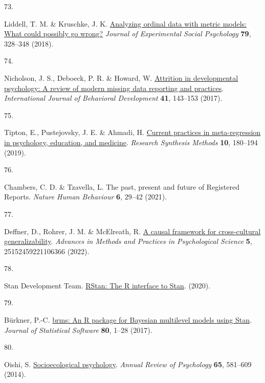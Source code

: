 \documentclass[
  man,floatsintext]{apa6}
\newlength{\cslhangindent}
\newlength{\csllabelwidth}
\newlength{\cslentryspacingunit} %
\newenvironment{CSLReferences}[2] %
 {%
  \setlength{\parindent}{0pt}
  \ifodd #1
  \let\oldpar\par
  \def\par{\hangindent=\cslhangindent\oldpar}
  \fi
  \setlength{\parskip}{#2\cslentryspacingunit}
 }%
 {}
\newcommand{\CSLLeftMargin}[1]{\parbox[t]{\csllabelwidth}{#1}}
\newcommand{\CSLRightInline}[1]{\parbox[t]{\linewidth - \csllabelwidth}{#1}\break}
\begin{document}
\begin{CSLReferences}{0}{0}
\leavevmode{}%
\CSLLeftMargin{73. }%
\CSLRightInline{Liddell, T. M. \& Kruschke, J. K. \href{https://doi.org/10.1016/j.jesp.2018.08.009}{Analyzing ordinal data with metric models: What could possibly go wrong?} \emph{Journal of Experimental Social Psychology} \textbf{79}, 328--348 (2018).}

\leavevmode{}%
\CSLLeftMargin{74. }%
\CSLRightInline{Nicholson, J. S., Deboeck, P. R. \& Howard, W. \href{https://doi.org/10.1177/0165025415618275}{Attrition in developmental psychology: A review of modern missing data reporting and practices}. \emph{International Journal of Behavioral Development} \textbf{41}, 143--153 (2017).}

\leavevmode{}%
\CSLLeftMargin{75. }%
\CSLRightInline{Tipton, E., Pustejovsky, J. E. \& Ahmadi, H. \href{https://doi.org/10.1002/jrsm.1339}{Current practices in meta-regression in psychology, education, and medicine}. \emph{Research Synthesis Methods} \textbf{10}, 180--194 (2019).}

\leavevmode{}%
\CSLLeftMargin{76. }%
\CSLRightInline{Chambers, C. D. \& Tzavella, L. The past, present and future of {Registered Reports}. \emph{Nature Human Behaviour} \textbf{6}, 29--42 (2021).}

\leavevmode{}%
\CSLLeftMargin{77. }%
\CSLRightInline{Deffner, D., Rohrer, J. M. \& McElreath, R. \href{https://doi.org/10.1177/25152459221106366}{A causal framework for cross-cultural generalizability}. \emph{Advances in Methods and Practices in Psychological Science} \textbf{5}, 25152459221106366 (2022).}

\leavevmode{}%
\CSLLeftMargin{78. }%
\CSLRightInline{Stan Development Team. \href{http://mc-stan.org/}{{RStan}: The {R} interface to {Stan}}. (2020).}

\leavevmode{}%
\CSLLeftMargin{79. }%
\CSLRightInline{Bürkner, P.-C. \href{https://doi.org/10.18637/jss.v080.i01}{{brms}: An {R} package for {Bayesian} multilevel models using {Stan}}. \emph{Journal of Statistical Software} \textbf{80}, 1--28 (2017).}

\leavevmode{}%
\CSLLeftMargin{80. }%
\CSLRightInline{Oishi, S. \href{https://doi.org/10.1146/annurev-psych-030413-152156}{Socioecological psychology}. \emph{Annual Review of Psychology} \textbf{65}, 581--609 (2014).}


\end{CSLReferences}
\end{document}
